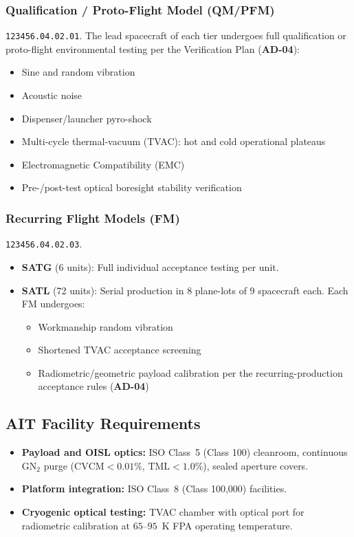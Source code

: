\subsubsection{Qualification / Proto-Flight Model (QM/PFM)}
 \texttt{123456.04.02.01}. The lead spacecraft of each tier undergoes full qualification or proto-flight environmental testing per the Verification Plan (\textbf{AD-04}):
\begin{itemize}
    \item Sine and random vibration
    \item Acoustic noise
    \item Dispenser/launcher pyro-shock
    \item Multi-cycle thermal-vacuum (TVAC): hot and cold operational plateaus
    \item Electromagnetic Compatibility (EMC)
    \item Pre-/post-test optical boresight stability verification
\end{itemize}

\subsubsection{Recurring Flight Models (FM)}
 \texttt{123456.04.02.03}.
\begin{itemize}
    \item \textbf{SATG} (6 units): Full individual acceptance testing per unit.
    \item \textbf{SATL} (72 units): Serial production in 8 plane-lots of 9 spacecraft each. Each FM undergoes:
    \begin{itemize}
        \item Workmanship random vibration
        \item Shortened TVAC acceptance screening
        \item Radiometric/geometric payload calibration per the recurring-production acceptance rules (\textbf{AD-04})
    \end{itemize}
\end{itemize}

\subsection{AIT Facility Requirements}

\begin{itemize}
    \item \textbf{Payload and OISL optics:} ISO Class~5 (Class 100) cleanroom, continuous $\mathrm{GN_2}$ purge ($\mathrm{CVCM} < 0.01\%$, $\mathrm{TML} < 1.0\%$), sealed aperture covers.
    \item \textbf{Platform integration:} ISO Class~8 (Class 100,000) facilities.
    \item \textbf{Cryogenic optical testing:} TVAC chamber with optical port for radiometric calibration at $65$--$95$~K FPA operating temperature.
\end{itemize}

